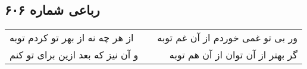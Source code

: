 \begin{center}
\section*{رباعی شماره ۶۰۶}
\label{sec:sh606}
\begin{longtable}{l p{0.5cm} r}
از هر چه نه از بهر تو کردم توبه
&&
ور بی تو غمی خوردم از آن غم توبه
\\
و آن نیز که بعد ازین برای تو کنم
&&
گر بهتر از آن توان از آن هم توبه
\\
\end{longtable}
\end{center}
